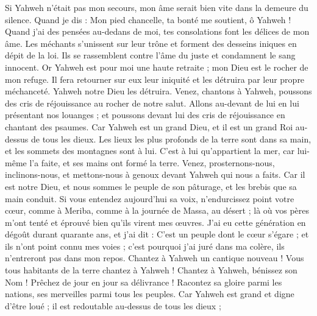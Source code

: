 \begin{multicols}{2}
Si Yahweh n’était pas mon secours, mon âme serait bien vite dans la demeure du silence.
Quand je dis : Mon pied chancelle, ta bonté me soutient, ô Yahweh !
Quand j’ai des pensées au-dedans de moi, tes consolations font les délices de mon âme.
Les méchants s’unissent sur leur trône et forment des desseins iniques en dépit de la loi.
Ils se rassemblent contre l'âme du juste et condamnent le sang innocent.
Or Yahweh est pour moi une haute retraite ; mon Dieu est le rocher de mon refuge.
Il fera retourner sur eux leur iniquité et les détruira par leur propre méchanceté. Yahweh notre Dieu les détruira.
\VerseOne{}Venez, chantons à Yahweh, poussons des cris de réjouissance au rocher de notre salut.
Allons au-devant de lui en lui présentant nos louanges ; et poussons devant lui des cris de réjouissance en chantant des psaumes.
Car Yahweh est un grand Dieu, et il est un grand Roi au-dessus de tous les dieux.
Les lieux les plus profonds de la terre sont dans sa main, et les sommets des montagnes sont à lui.
C'est à lui qu'appartient la mer, car lui-même l'a faite, et ses mains ont formé la terre.
Venez, prosternons-nous, inclinons-nous, et mettons-nous à genoux devant Yahweh qui nous a faits.
Car il est notre Dieu, et nous sommes le peuple de son pâturage, et les brebis que sa main conduit. Si vous entendez aujourd'hui sa voix,
n'endurcissez point votre cœur, comme à Meriba, comme à la journée de Massa, au désert ;
là où vos pères m'ont tenté et éprouvé bien qu’ils virent mes œuvres.
J'ai eu cette génération en dégoût durant quarante ans, et j'ai dit : C'est un peuple dont le cœur s'égare ; et ils n'ont point connu mes voies ;
c'est pourquoi j'ai juré dans ma colère, ils n’entreront pas dans mon repos.
\VerseOne{}Chantez à Yahweh un cantique nouveau ! Vous tous habitants de la terre chantez à Yahweh !
Chantez à Yahweh, bénissez son Nom ! Prêchez de jour en jour sa délivrance !
Racontez sa gloire parmi les nations, ses merveilles parmi tous les peuples.
Car Yahweh est grand et digne d'être loué ; il est redoutable au-dessus de tous les dieux ;

\end{multicols}
